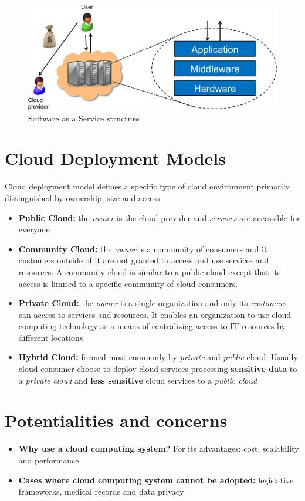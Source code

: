 \begin{figure}[!h]
    \centering
    \includegraphics[width=.60\linewidth]{images/CloudComputing/saas.png}
    \caption{Software as a Service structure}
\end{figure}

\section{Cloud Deployment Models}
Cloud deployment model defines a specific type of cloud environment primarily distinguished by ownership, size and access.
\begin{itemize}
    \item \textbf{Public Cloud:} the \textit{owner} is the cloud provider and \textit{services} are accessible for everyone
    \item \textbf{Community Cloud:} the \textit{owner} is a community of consumers and it customers outside of it are not granted to access and use services and resources.  A community cloud is similar to a public cloud except that its access is limited to a specific community of cloud consumers.
    \item \textbf{Private Cloud:} the \textit{owner} is a single organization and only its \textit{customers} can access to services and resources. It enables an organization to use cloud computing technology as a means of centralizing access to IT resources by different locations
    \item \textbf{Hybrid Cloud:} formed most commonly by \textit{private} and \textit{public} cloud. Usually cloud consumer choose to deploy cloud services processing \textbf{sensitive data} to a \textit{private cloud} and \textbf{less sensitive} cloud services to a \textit{public cloud}
\end{itemize}

\section{Potentialities and concerns}
\begin{itemize}
    \item \textbf{Why use a cloud computing system?} For its advantages: cost, scalability and performance
    \item \textbf{Cases where cloud computing system cannot be adopted:} legislative frameworks, medical records and data privacy
\end{itemize}